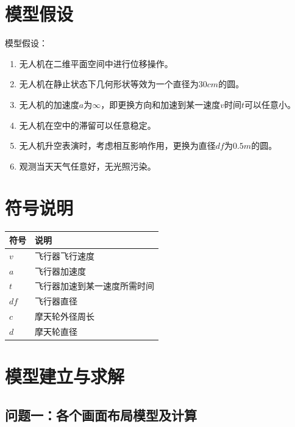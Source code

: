 \documentclass[UTF8,12pt]{ctexart}
\begin{document}
\section{模型假设}
模型假设：
\begin{enumerate}
    \item 无人机在二维平面空间中进行位移操作。
    \item 无人机在静止状态下几何形状等效为一个直径为30$cm$的圆。
    \item 无人机的加速度$a$为$\infty$，即更换方向和加速到某一速度$v$时间$t$可以任意小。
    \item 无人机在空中的滞留可以任意稳定。
    \item 无人机升空表演时，考虑相互影响作用，更换为直径$df$为$0.5m$的圆。
    \item 观测当天天气任意好，无光照污染。
\end{enumerate}
\section{符号说明}
    \begin{table}[h]
        \vspace{20pt}
        \centering
        \begin{tabular}{p{2cm}p{6cm}}
            \hline
            符号    &   说明 \\
            \hline       
            $v$     &   飞行器飞行速度 \\
            $a$     &   飞行器加速度 \\
            $t$     &   飞行器加速到某一速度所需时间 \\
            $df$    &   飞行器直径 \\
            $c$     &   摩天轮外径周长 \\
            $d$     &   摩天轮直径 \\
            \hline
        \end{tabular}
    \end{table}
\section{模型建立与求解}
\subsection{问题一：各个画面布局模型及计算}
\end{document}

